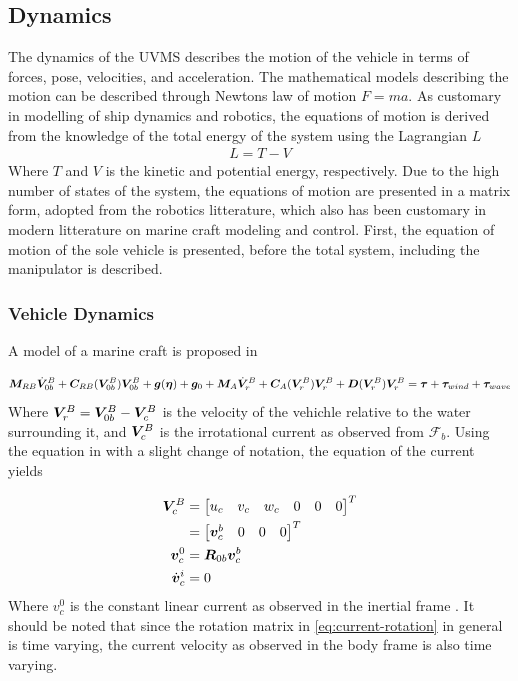 \subsection{Dynamics}
The dynamics of the UVMS describes the motion of the vehicle in terms of forces, pose, velocities, and acceleration. The mathematical models describing the motion can be described through Newtons law of motion $F=ma$. As customary in modelling of ship dynamics and robotics, the equations of motion is derived from the knowledge of the total energy of the system using the Lagrangian $L$
\begin{align}
	L=T-V
	\label{eq:lagrange}
\end{align}
Where $T$ and $V$ is the kinetic and potential energy, respectively. Due to the high number of states of the system, the equations of motion are presented in a matrix form, adopted from the robotics litterature, which also has been customary in modern litterature on marine craft modeling and control. First, the equation of motion of the sole vehicle is presented, before the total system, including the manipulator is described.

\subsubsection{Vehicle Dynamics}

A model of a marine craft is proposed in \cite{fs} 

\begin{align}
\boldsymbol M_{RB}\dot{\boldsymbol V}_{0b}^B + \boldsymbol C_{RB}(\boldsymbol V_{0b}^B)\boldsymbol V_{0b}^B + \boldsymbol g(\boldsymbol \eta) + \boldsymbol g_0 + \boldsymbol M_A \dot{\boldsymbol V}_{r}^B  + \boldsymbol C_A(\boldsymbol V_{r}^B) \boldsymbol V_{r}^B + \boldsymbol D(\boldsymbol V_{r}^B)\boldsymbol V_{r}^B = \boldsymbol \tau + \boldsymbol \tau_{wind} + \boldsymbol \tau_{wave} 
\label{eq:fossen1}
\end{align}
Where $ \boldsymbol V_{r}^B = \boldsymbol V_{0b}^B - \boldsymbol V_c^{B}$ is the velocity of the vehichle relative to the water surrounding it, and $ \boldsymbol V_{c}^{B}$ is the irrotational current as observed from $\mathcal F_b$. Using the equation in \cite{fs} with a slight change of notation, the equation of the current yields

\begin{align}
	\boldsymbol V_c^{B}&=\begin{bmatrix} u_c & v_c & w_c & 0 & 0 & 0\end{bmatrix}^T 
  \label{eq:current}
  \\
  &= \begin{bmatrix} \boldsymbol v_c^b & 0 & 0 & 0 \end{bmatrix}^T
  \\
  \boldsymbol v_c^0 &= \boldsymbol R_{0b}\boldsymbol v_c^b 
	\label{eq:current-rotation}
  \\
  \dot{\boldsymbol v}_c^i&=0
\end{align}
Where $v_{c}^{0}$ is the constant linear current as observed in the inertial frame . It should be noted that since the rotation matrix in \eqref{eq:current-rotation} in general is time varying, the current velocity as observed in the body frame is also time varying. 

